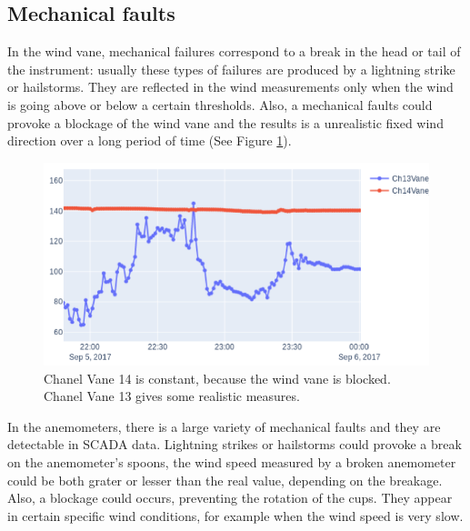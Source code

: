 \documentclass[conference]{IEEEtran}
\begin{document}
\subsection{Mechanical faults}
In the wind vane, mechanical failures correspond to a break in the head or tail of the instrument: usually these types of failures are produced by a lightning strike or hailstorms. They are reflected in the wind measurements only when the wind is going above or below a certain thresholds. Also, a mechanical faults could provoke a blockage of the wind vane and the results is a unrealistic fixed wind direction over a long period of time (See Figure \ref{fig:mechanicalfaults}).
\begin{figure}[h]
	\centering
	\includegraphics[width=\columnwidth]{Images/MechanicalFaults.png}
	\caption{Chanel Vane 14 is constant, because the wind vane is blocked. Chanel Vane 13 gives some realistic measures.}
	\label{fig:mechanicalfaults}
\end{figure}
In the anemometers, there is a large variety of mechanical faults and they are detectable in SCADA data. Lightning strikes or hailstorms could provoke a break on the anemometer's spoons, the wind speed measured by a broken anemometer could be both grater or lesser than the real value, depending on the breakage. Also, a blockage could occurs, preventing the rotation of the cups. They appear in certain specific wind conditions, for example when the wind speed is very slow.
\end{document}
